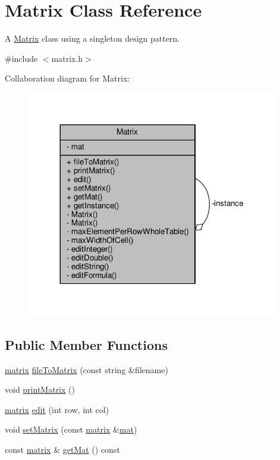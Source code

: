 \hypertarget{class_matrix}{}\section{Matrix Class Reference}
\label{class_matrix}


A \hyperlink{class_matrix}{Matrix} class using a singleton design pattern.  




{\ttfamily \#include $<$matrix.\+h$>$}



Collaboration diagram for Matrix\+:
\nopagebreak
\begin{figure}[H]
\begin{center}
\leavevmode
\includegraphics[width=311pt]{class_matrix__coll__graph}
\end{center}
\end{figure}
\subsection*{Public Member Functions}
\begin{DoxyCompactItemize}
\item 
\hyperlink{formula_8h_a869e2a5deeb3daa4c82d6bc91cf20d92}{matrix} \hyperlink{class_matrix_a35eb9dcb01c552fea1f5926db35339ef}{file\+To\+Matrix} (const string \&filename)
\item 
void \hyperlink{class_matrix_aa1967ad240a5ffaf492800044b7275d9}{print\+Matrix} ()
\item 
\hyperlink{formula_8h_a869e2a5deeb3daa4c82d6bc91cf20d92}{matrix} \hyperlink{class_matrix_a34b2269a2b6d06c202439de2e64009ba}{edit} (int row, int col)
\item 
void \hyperlink{class_matrix_a8c45dd1354fa25e14065cab23f3074c0}{set\+Matrix} (const \hyperlink{formula_8h_a869e2a5deeb3daa4c82d6bc91cf20d92}{matrix} \&\hyperlink{class_matrix_a1b0c75c45092426431308172aab92c66}{mat})
\item 
const \hyperlink{formula_8h_a869e2a5deeb3daa4c82d6bc91cf20d92}{matrix} \& \hyperlink{class_matrix_a52d82641f52304c9b6525747cd7f960c}{get\+Mat} () const
\end{DoxyCompactItemize}

